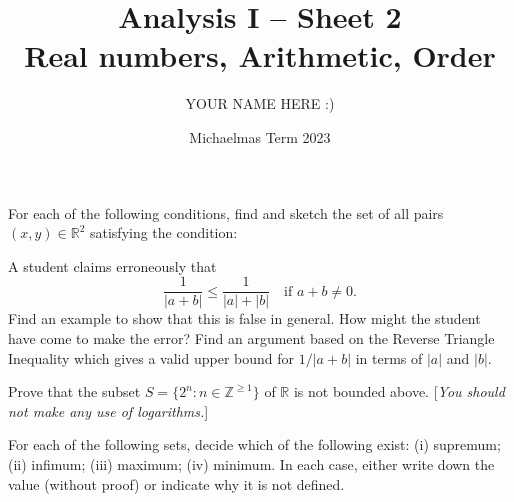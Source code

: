 \documentclass[answers]{exam}
\title{Analysis I -- Sheet 2\\Real numbers, Arithmetic, Order}
\author{YOUR NAME HERE :)}
\date{Michaelmas Term 2023}
\begin{document}
\maketitle
\begin{questions}

\question%
For each of the following conditions, find and sketch the set of all pairs $(x, y) \in \mathbb{R}^{2}$ satisfying the condition:



\question%
A student claims erroneously that \[
	\frac{1}{|a+b|} \leqslant \frac{1}{|a|+|b|} \quad\text {if } a+b \neq 0.
\] Find an example to show that this is false in general. How might the student have come to make the error? Find an argument based on the Reverse Triangle Inequality which gives a valid upper bound for $1 /|a+b|$ in terms of $|a|$ and $|b|$.



\question%
Prove that the subset $S=\{2^{n}: n \in \mathbb{Z}^{\geqslant 1}\}$ of $\mathbb{R}$ is not bounded above. [\emph{You should not make any use of logarithms.}]



\question%
For each of the following sets, decide which of the following exist: (i) supremum; (ii) infimum; (iii) maximum; (iv) minimum. In each case, either write down the value (without proof) or indicate why it is not defined.
\end{questions}
\end{document}
